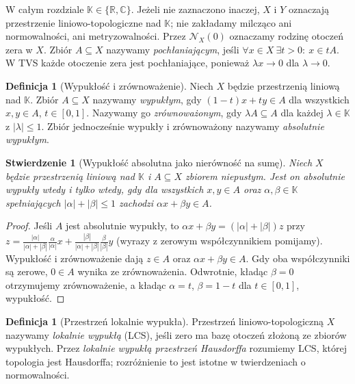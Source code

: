 \documentclass[11pt,a4paper]{article}
\numberwithin{equation}{section}
\theoremstyle{plain}
\newtheorem{stwierdzenie}[twierdzenie]{Stwierdzenie}
\theoremstyle{definition}
\newtheorem{definicja}[twierdzenie]{Definicja}
\theoremstyle{remark}
\newcommand{\R}{\mathbb R}
\newcommand{\C}{\mathbb C}
\newcommand{\K}{\mathbb K}
\begin{document}
W całym rozdziale $\K\in\{\R,\C\}$. Jeżeli nie zaznaczono inaczej,
$X$ i $Y$ oznaczają przestrzenie liniowo-topologiczne nad $\K$;
nie zakładamy milcząco ani normowalności, ani metryzowalności.
Przez $\mathcal N_X(0)$ oznaczamy rodzinę otoczeń zera w $X$.
Zbiór $A\subseteq X$ nazywamy \emph{pochłaniającym}, jeśli
$\forall x\in X\ \exists t>0:\ x\in tA$.
W TVS każde otoczenie zera jest pochłaniające, ponieważ
$\lambda x\to0$ dla $\lambda\to0$.

\begin{definicja}[Wypukłość i zrównoważenie]
Niech $X$ będzie przestrzenią liniową nad $\K$.
Zbiór $A\subseteq X$ nazywamy \emph{wypukłym}, gdy
$(1-t)x+ty\in A$ dla wszystkich $x,y\in A$, $t\in[0,1]$.
Nazywamy go \emph{zrównoważonym}, gdy $\lambda A\subseteq A$
dla każdej $\lambda\in\K$ z $|\lambda|\le1$.
Zbiór jednocześnie wypukły i zrównoważony nazywamy
\emph{absolutnie wypukłym}.
\end{definicja}

\begin{stwierdzenie}[Wypukłość absolutna jako nierówność na sumę]
\label{prop:absolutna}
Niech $X$ będzie przestrzenią liniową nad $\K$ i
$A\subseteq X$ zbiorem niepustym. Jest on absolutnie wypukły
wtedy i tylko wtedy, gdy dla wszystkich $x,y\in A$ oraz
$\alpha,\beta\in\K$ spełniających $|\alpha|+|\beta|\le1$
zachodzi $\alpha x+\beta y\in A$.
\end{stwierdzenie}
\begin{proof}
Jeśli $A$ jest absolutnie wypukły, to
$\alpha x+\beta y=(|\alpha|+|\beta|)z$ przy
$z=\frac{|\alpha|}{|\alpha|+|\beta|}\frac{\alpha}{|\alpha|}x+
\frac{|\beta|}{|\alpha|+|\beta|}\frac{\beta}{|\beta|}y$
(wyrazy z zerowym współczynnikiem pomijamy).
Wypukłość i zrównoważenie dają $z\in A$ oraz
$\alpha x+\beta y\in A$. Gdy oba współczynniki są zerowe,
$0\in A$ wynika ze zrównoważenia. Odwrotnie, kładąc
$\beta=0$ otrzymujemy zrównoważenie, a kładąc
$\alpha=t$, $\beta=1-t$ dla $t\in[0,1]$, wypukłość.
\end{proof}

\begin{definicja}[Przestrzeń lokalnie wypukła]
\label{def:lcs}
Przestrzeń liniowo-topologiczną $X$ nazywamy
\emph{lokalnie wypukłą} (LCS), jeśli zero ma bazę otoczeń
złożoną ze zbiorów wypukłych. Przez \emph{lokalnie wypukłą
przestrzeń Hausdorffa} rozumiemy LCS, której topologia jest
Hausdorffa; rozróżnienie to jest istotne w twierdzeniach o normowalności.
\end{definicja}
\end{document}
